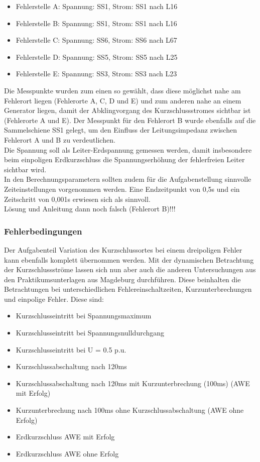 \documentclass{scrartcl}
\begin{document}
\begin{onehalfspace}
\begin{itemize}
\item Fehlerstelle A: Spannung: SS1, Strom: SS1 nach L16
\item Fehlerstelle B: Spannung: SS1, Strom: SS1 nach L16
\item Fehlerstelle C: Spannung: SS6, Strom: SS6 nach L67
\item Fehlerstelle D: Spannung: SS5, Strom: SS5 nach L25
\item Fehlerstelle E: Spannung: SS3, Strom: SS3 nach L23
\end{itemize}

Die Messpunkte wurden zum einen so gewählt, dass diese möglichst nahe am Fehlerort liegen (Fehlerorte A, C, D und E) und zum anderen nahe an einem Generator liegen, damit der Abklingvorgang des Kurzschlussstromes sichtbar ist (Fehlerorte A und E). Der Messpunkt für den Fehlerort B wurde ebenfalls auf die Sammelschiene SS1 gelegt, um den Einfluss der Leitungsimpedanz zwischen Fehlerort A und B zu verdeutlichen. \\
Die Spannung soll als Leiter-Erdspannung gemessen werden, damit insbesondere beim einpoligen Erdkurzschluss die Spannungserhöhung der fehlerfreien Leiter sichtbar wird. \\
In den Berechnungsparametern sollten zudem für die Aufgabenstellung sinnvolle Zeiteinstellungen vorgenommen werden. Eine Endzeitpunkt von 0,5s und ein Zeitschritt von 0,001s erwiesen sich als sinnvoll.
\\ Lösung und Anleitung dann noch falsch (Fehlerort B)!!!


\subsubsection{Fehlerbedingungen}
Der Aufgabenteil \glqq Variation des Kurzschlussortes bei einem dreipoligen Fehler\grqq{} kann ebenfalls komplett übernommen werden. Mit der dynamischen Betrachtung der Kurzschlussströme lassen sich nun aber auch die anderen Untersuchungen aus den Praktikumsunterlagen aus Magdeburg durchführen. Diese beinhalten die Betrachtungen bei unterschiedlichen Fehlereinschaltzeiten, Kurzunterbrechungen und einpolige Fehler. Diese sind:

\begin{itemize}
\item Kurzschlusseintritt bei Spannungsmaximum
\item Kurzschlusseintritt bei Spannungsnulldurchgang
\item Kurzschlusseintritt bei U = 0.5 p.u.
\item Kurzschlussabschaltung nach 120ms
\item Kurzschlussabschaltung nach 120ms mit Kurzunterbrechung (100ms) (AWE mit Erfolg)
\item Kurzunterbrechung nach 100ms ohne Kurzschlussabschaltung (AWE ohne Erfolg)
\item Erdkurzschluss AWE mit Erfolg
\item Erdkurzschluss AWE ohne Erfolg
\end{itemize}


\end{onehalfspace}
\end{document}
